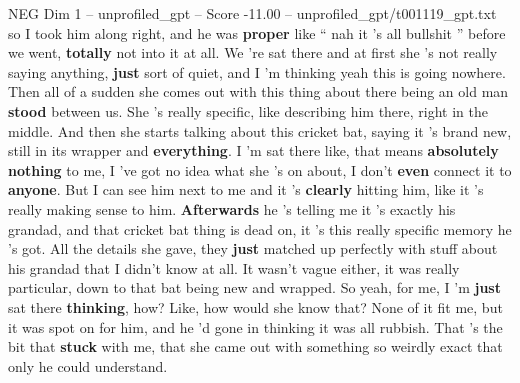 \begin{textsample}{NEG Dim 1 – unprofiled\_gpt – Score -11.00 – unprofiled\_gpt/t001119\_gpt.txt}  \label{ex:f1_neg_022}
so I took him along right, and he was \textbf{proper} like “ nah it ’s all bullshit ” before we went, \textbf{totally} not into it at all.
We ’re sat there and at first she ’s not really saying anything, \textbf{just} sort of quiet, and I ’m thinking yeah this is going nowhere.
Then all of a sudden she comes out with this thing about there being an old man \textbf{stood} between us.
She ’s really specific, like describing him there, right in the middle.
And then she starts talking about this cricket bat, saying it ’s brand new, still in its wrapper and \textbf{everything}.
I ’m sat there like, that means \textbf{absolutely} \textbf{nothing} to me, I ’ve got no idea what she ’s on about, I don't \textbf{even} connect it to \textbf{anyone}.
But I can see him next to me and it ’s \textbf{clearly} hitting him, like it ’s really making sense to him. \textbf{Afterwards} he ’s telling me it ’s exactly his grandad, and that cricket bat thing is dead on, it ’s this really specific memory he ’s got.
All the details she gave, they \textbf{just} matched up perfectly with stuff about his grandad that I didn't know at all.
It wasn't vague either, it was really particular, down to that bat being new and wrapped.
So yeah, for me, I ’m \textbf{just} sat there \textbf{thinking}, how?
Like, how would she know that?
None of it fit me, but it was spot on for him, and he ’d gone in thinking it was all rubbish.
That ’s the bit that \textbf{stuck} with me, that she came out with something so weirdly exact that only he could understand.

\end{textsample}
